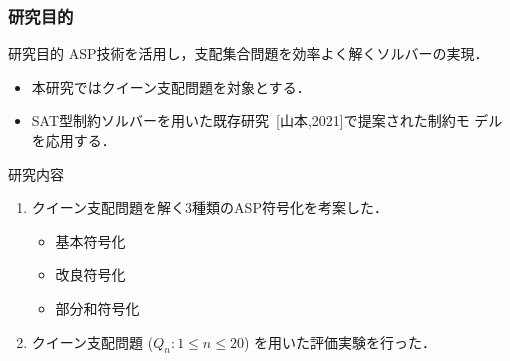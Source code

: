 \documentclass[dvipdfmx,10pt]{beamer}
\begin{document}
\begin{frame}\frametitle{研究目的}
 \begin{alertblock}{研究目的}\centering
  ASP技術を活用し，支配集合問題を効率よく解くソルバーの実現．
 \end{alertblock}

 \begin{itemize}
 \item 本研究ではクイーン支配問題を対象とする．
 \item SAT型制約ソルバーを用いた既存研究~[山本,2021]で提案された制約モ
   デルを応用する．
 \end{itemize}

 \begin{block}{研究内容}
  \begin{enumerate}
   \item クイーン支配問題を解く3種類のASP符号化を考案した．
     \begin{itemize}
     \item 基本符号化
     \item 改良符号化
     \item 部分和符号化
     \end{itemize}
   \item クイーン支配問題 ($Q_{n}: 1\leq n\leq 20$) を用いた評価実験を行った．
  \end{enumerate}
 \end{block}
\end{frame}

%
%
\end{document}
